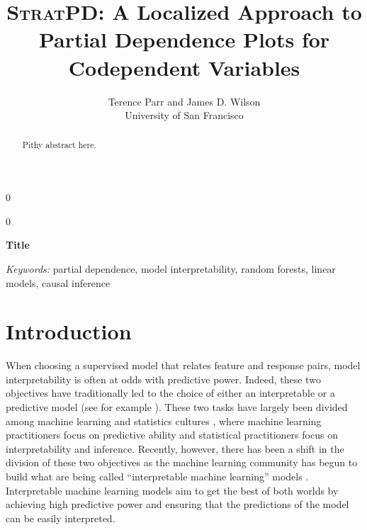 \documentclass[12pt]{article}
\newcommand{\blind}{0}
\begin{document}
\def\spacingset#1{\renewcommand{\baselinestretch}%
{#1}\small\normalsize} \spacingset{1}



\blind
{
  \title{{\textsc{StratPD}}: \bf A Localized Approach to Partial Dependence Plots for Codependent Variables}

  \author{Terence Parr and James D. Wilson\\
      University of San Francisco\\
}
  \maketitle
} \fi

\blind
{
  \bigskip
  \bigskip
  \bigskip
  \begin{center}
    {\LARGE\bf Title}
\end{center}
  \medskip
} \fi

\bigskip
\begin{abstract}
Pithy abstract here.
\end{abstract}

\noindent%
{\it Keywords:} partial dependence, model interpretability, random forests, linear models, causal inference

\section{Introduction}
\label{sec:intro}

When choosing a supervised model that relates feature and response pairs, model interpretability is often at odds with predictive power. Indeed, these two objectives have traditionally led to the choice of either an interpretable or a predictive model (see for example \cite{shmueli2010explain}). These two tasks have largely been divided among machine learning and statistics cultures \citep{breiman2001statistical, donoho201750}, where machine learning practitioners focus on predictive ability and statistical practitioners focus on interpretability and inference. Recently, however, there has been a shift in the division of these two objectives as the machine learning community has begun to build what are being called  ``interpretable machine learning'' models \citep{doshi2017towards, vellido2012making}. Interpretable machine learning models aim to get the best of both worlds by achieving high predictive power and ensuring that the predictions of the model can be easily interpreted. 
\end{document}
